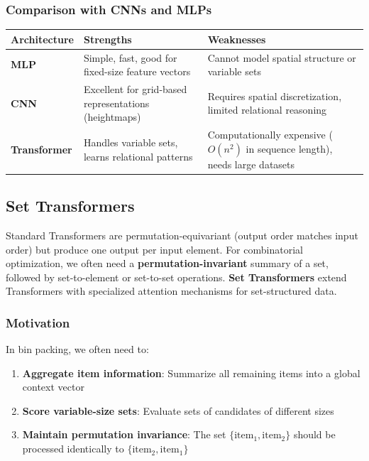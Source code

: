 \subsubsection{Comparison with CNNs and MLPs}

\begin{table}[h]
\centering
\begin{tabular}{|l|p{5.5cm}|p{5.5cm}|}
\hline
\textbf{Architecture} & \textbf{Strengths} & \textbf{Weaknesses} \\
\hline
\textbf{MLP} & Simple, fast, good for fixed-size feature vectors & Cannot model spatial structure or variable sets \\
\hline
\textbf{CNN} & Excellent for grid-based representations (heightmaps) & Requires spatial discretization, limited relational reasoning \\
\hline
\textbf{Transformer} & Handles variable sets, learns relational patterns & Computationally expensive ($O(n^2)$ in sequence length), needs large datasets \\
\hline
\end{tabular}
\end{table}


\subsection{Set Transformers}

Standard Transformers are permutation-equivariant (output order matches input order) but produce one output per input element. For combinatorial optimization, we often need a \textbf{permutation-invariant} summary of a set, followed by set-to-element or set-to-set operations. \textbf{Set Transformers} \cite{LSK+19} extend Transformers with specialized attention mechanisms for set-structured data.

\subsubsection{Motivation}

In bin packing, we often need to:

\begin{enumerate}
\item \textbf{Aggregate item information}: Summarize all remaining items into a global context vector
\item \textbf{Score variable-size sets}: Evaluate sets of candidates of different sizes
\item \textbf{Maintain permutation invariance}: The set $\{\text{item}_1, \text{item}_2\}$ should be processed identically to $\{\text{item}_2, \text{item}_1\}$
\end{enumerate}

